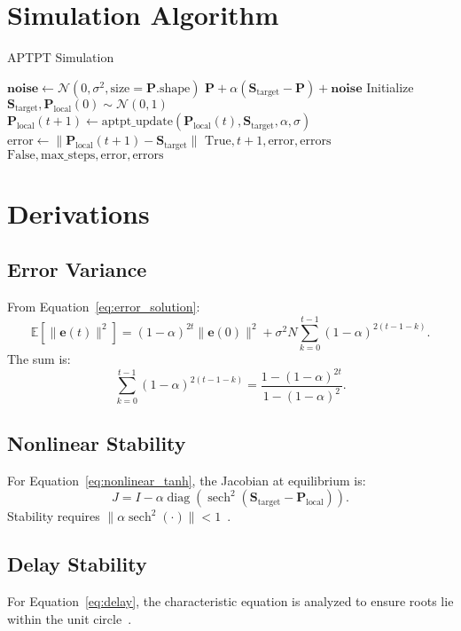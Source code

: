 \documentclass[12pt]{article}
\begin{document}
\section{Simulation Algorithm}
\begin{algorithm}
\caption{APTPT Simulation}
\begin{algorithmic}[1]
    \State $\mathbf{noise} \gets \mathcal{N}(0, \sigma^2, \text{size}=\mathbf{P}.\text{shape})$
    \State \Return $\mathbf{P} + \alpha (\mathbf{S}_{\text{target}} - \mathbf{P}) + \mathbf{noise}$
\EndFunction
{}
    \State Initialize $\mathbf{S}_{\text{target}}, \mathbf{P}_{\text{local}}(0) \sim \mathcal{N}(0,1)$
        \State $\mathbf{P}_{\text{local}}(t+1) \gets \text{aptpt\_update}(\mathbf{P}_{\text{local}}(t), \mathbf{S}_{\text{target}}, \alpha, \sigma)$
        \State $\text{error} \gets \|\mathbf{P}_{\text{local}}(t+1) - \mathbf{S}_{\text{target}}\|$
            \State \Return $\text{True}, t+1, \text{error}, \text{errors}$
        \EndIf
    \EndFor
    \State \Return $\text{False}, \text{max\_steps}, \text{error}, \text{errors}$
\EndFunction
\end{algorithmic}
\end{algorithm}

\section{Derivations}
\subsection{Error Variance}
From Equation~\ref{eq:error_solution}:
\[
\mathbb{E}[\|\mathbf{e}(t)\|^2] = (1-\alpha)^{2t} \|\mathbf{e}(0)\|^2 + \sigma^2 N \sum_{k=0}^{t-1} (1-\alpha)^{2(t-1-k)}.
\]
The sum is:
\[
\sum_{k=0}^{t-1} (1-\alpha)^{2(t-1-k)} = \frac{1 - (1-\alpha)^{2t}}{1 - (1-\alpha)^2}.
\]

\subsection{Nonlinear Stability}
For Equation~\ref{eq:nonlinear_tanh}, the Jacobian at equilibrium is:
\[
J = I - \alpha \operatorname{diag}(\operatorname{sech}^2(\mathbf{S}_{\text{target}} - \mathbf{P}_{\text{local}})).
\]
Stability requires $\|\alpha \operatorname{sech}^2(\cdot)\| < 1$~\citep{Khalil2002}.

\subsection{Delay Stability}
For Equation~\ref{eq:delay}, the characteristic equation is analyzed to ensure roots lie within the unit circle~\citep{OlfatiSaber2007}.
\end{document}
